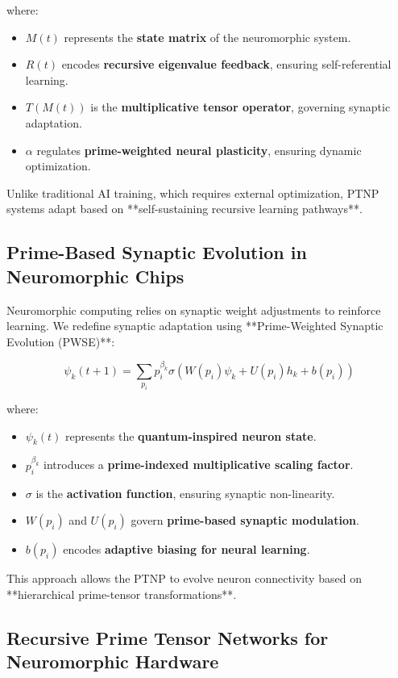 \documentclass{article}
\theoremstyle{plain}
\theoremstyle{plain}
\theoremstyle{definition}
\theoremstyle{remark}
\begin{document}
where:
\begin{itemize}
    \item $M(t)$ represents the \textbf{state matrix} of the neuromorphic system.
    \item $R(t)$ encodes \textbf{recursive eigenvalue feedback}, ensuring self-referential learning.
    \item $T(M(t))$ is the \textbf{multiplicative tensor operator}, governing synaptic adaptation.
    \item $\alpha$ regulates \textbf{prime-weighted neural plasticity}, ensuring dynamic optimization.
\end{itemize}

Unlike traditional AI training, which requires external optimization, PTNP systems adapt based on **self-sustaining recursive learning pathways**.

\subsection{Prime-Based Synaptic Evolution in Neuromorphic Chips}

Neuromorphic computing relies on synaptic weight adjustments to reinforce learning. We redefine synaptic adaptation using **Prime-Weighted Synaptic Evolution (PWSE)**:

\begin{equation}
\psi_k (t+1) = \sum_{p_i} p_i^{\beta_k} \sigma (W(p_i) \psi_k + U(p_i) h_k + b(p_i))
\end{equation}

where:
\begin{itemize}
    \item $\psi_k (t)$ represents the \textbf{quantum-inspired neuron state}.
    \item $p_i^{\beta_k}$ introduces a \textbf{prime-indexed multiplicative scaling factor}.
    \item $\sigma$ is the \textbf{activation function}, ensuring synaptic non-linearity.
    \item $W(p_i)$ and $U(p_i)$ govern \textbf{prime-based synaptic modulation}.
    \item $b(p_i)$ encodes \textbf{adaptive biasing for neural learning}.
\end{itemize}

This approach allows the PTNP to evolve neuron connectivity based on **hierarchical prime-tensor transformations**.

\subsection{Recursive Prime Tensor Networks for Neuromorphic Hardware}
\end{document}
